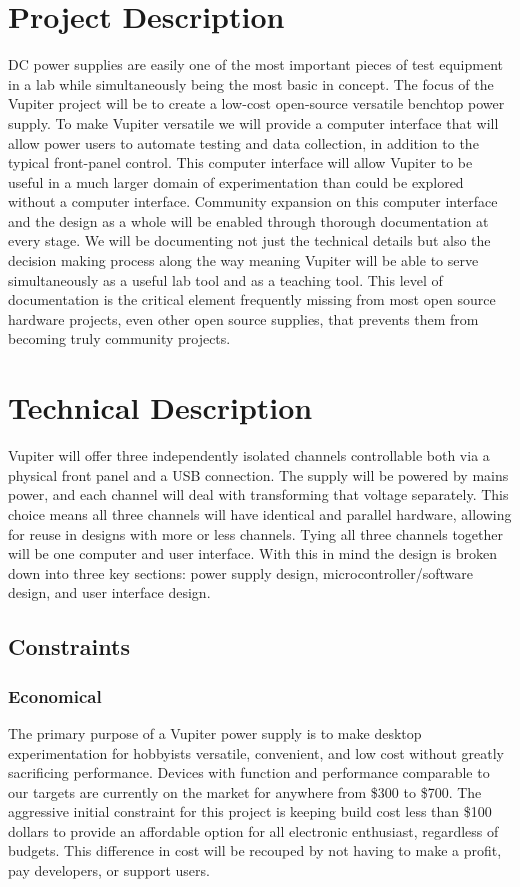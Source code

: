 \documentclass[12pt]{article}
\begin{document}
\section{Project Description}
DC power supplies are easily one of the most important pieces of test equipment 
in a lab while simultaneously being the most basic in concept. The focus of the 
Vupiter project will be to create a low-cost open-source versatile benchtop power 
supply. To make Vupiter versatile we will provide a computer interface that will 
allow power users to automate testing and data collection, in addition to the 
typical front-panel control. This computer interface will allow Vupiter to be 
useful in a much larger domain of experimentation than could be explored without a computer interface. 
Community expansion on this computer interface and the design as a whole will be 
enabled through thorough documentation at every stage. We will be documenting not 
just the technical details but also the decision making process along the way meaning 
Vupiter will be able to serve simultaneously as a useful lab tool and as a teaching 
tool. This level of documentation is the critical element frequently missing from most 
open source hardware projects, even other open source supplies, that prevents them 
from becoming truly community projects.
\section{Technical Description}
Vupiter will offer three independently isolated channels controllable both via a physical front panel and a USB connection. The supply will be powered by mains power, and each channel will deal with transforming that voltage separately. This choice means all three channels will have identical and parallel hardware, allowing for reuse in designs with more or less channels. Tying all three channels together will be one computer and user interface. With this in mind the design is broken down into three key sections: power supply design, microcontroller/software design, and user interface design.


\subsection{Constraints}
\subsubsection{Economical}
The primary purpose of a Vupiter power supply is to make desktop experimentation for 
hobbyists versatile, convenient, and low cost without greatly sacrificing performance. Devices 
with function and performance comparable to our targets are currently on the market for anywhere from \$300 to \$700. The aggressive initial constraint for this project is keeping build cost less than \$100 dollars to provide an affordable option for all electronic enthusiast, regardless of budgets. This difference in cost will be recouped by not having to make a profit, pay developers, or support users.
\end{document}
